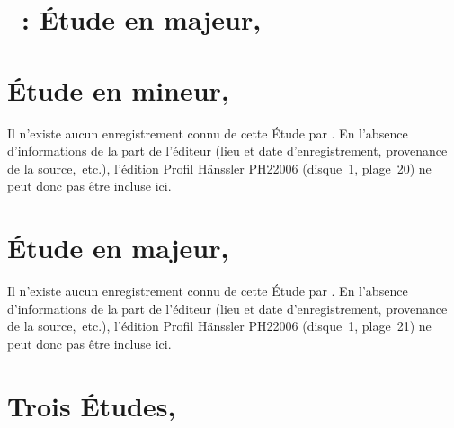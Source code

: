 \section{\ifChrono \Scriabine{}~: \fi
Étude en \kD \Flat majeur,  }
\label{\thesection}

\begin{workitemize}
 \item{}
 \begin{perfitemize}
  \item{}
  \item{}
 \end{perfitemize}
\end{workitemize}

\section*{%
Étude en \kF mineur,  }

Il n'existe aucun enregistrement connu de cette Étude par \VSofronitsky{}.
En l'absence d'informations de la part de l'éditeur (lieu et date
d'enregistrement, provenance de la source,~etc.), l'édition Profil Hänssler
PH22006 (disque~1, plage~20) ne peut donc pas être incluse ici.

\section*{%
Étude en \kE \Flat majeur,  }

Il n'existe aucun enregistrement connu de cette Étude par \VSofronitsky{}.
En l'absence d'informations de la part de l'éditeur (lieu et date
d'enregistrement, provenance de la source,~etc.), l'édition Profil Hänssler
PH22006 (disque~1, plage~21) ne peut donc pas être incluse ici.

\section*{%
Trois Études, }

